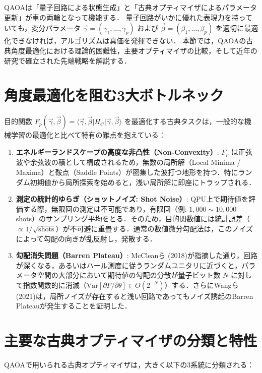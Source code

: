 \documentclass[11pt,a4paper,oneside,openany]{ltjsbook}
\theoremstyle{definition}
\theoremstyle{plain}
\theoremstyle{remark}
\newcommand{\mel}[3]{\langle#1|#2|#3\rangle}
\begin{document}
QAOAは「量子回路による状態生成」と「古典オプティマイザによるパラメータ更新」が車の両輪となって機能する．
量子回路がいかに優れた表現力を持っていても，変分パラメータ $\vec{\gamma} = (\gamma_1, \dots, \gamma_p)$ および $\vec{\beta} = (\beta_1, \dots, \beta_p)$ を適切に最適化できなければ，アルゴリズムは真価を発揮できない．
本節では，QAOAの古典角度最適化における理論的困難性，主要オプティマイザの比較，そして近年の研究で確立された先端戦略を解説する．

\section{角度最適化を阻む3大ボトルネック}
目的関数 $F_p(\vec{\gamma}, \vec{\beta}) = \mel{\vec{\gamma}, \vec{\beta}}{H_C}{\vec{\gamma}, \vec{\beta}}$ を最適化する古典タスクは，一般的な機械学習の最適化と比べて特有の難点を抱えている：

\begin{enumerate}
    \item \textbf{エネルギーランドスケープの高度な非凸性（Non-Convexity）}:
          $F_p$ は正弦波や余弦波の積として構成されるため，無数の局所解（Local Minima / Maxima）と鞍点（Saddle Points）が密集した波打つ地形を持つ．特にランダム初期値から局所探索を始めると，浅い局所解に即座にトラップされる．
    \item \textbf{測定の統計的ゆらぎ（ショットノイズ: Shot Noise）}:
          QPU上で期待値を評価する際，無限回の測定は不可能であり，有限回（例: $1,000 \sim 10,000$ shots）のサンプリング平均をとる．そのため，目的関数値には統計誤差（$\propto 1/\sqrt{\text{shots}}$）が不可避に重畳する．通常の数値微分勾配法は，このノイズによって勾配の向きが乱反射し，発散する．
    \item \textbf{勾配消失問題（Barren Plateau）}:
          McCleanら (2018)\cite{mcclean2018barren}が指摘した通り，回路が深くなる，あるいはハール測度に従うランダムユニタリに近づくと，パラメータ空間の大部分において期待値の勾配の分散が量子ビット数 $N$ に対して指数関数的に消滅（$\text{Var}[\partial F / \partial \theta] \in O(2^{-N})$）する．さらにWangら (2021)\cite{wang2021noise}は，局所ノイズが存在すると浅い回路であってもノイズ誘起のBarren Plateauが発生することを証明した．
\end{enumerate}

\section{主要な古典オプティマイザの分類と特性}
QAOAで用いられる古典オプティマイザは，大きく以下の3系統に分類される：
\end{document}
